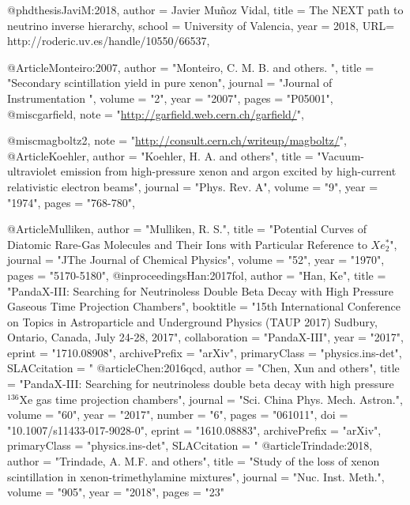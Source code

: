 @phdthesis{JaviM:2018,
  author       = {Javier Muñoz Vidal}, 
  title        = {The NEXT path to neutrino inverse hierarchy},
  school       = {University of Valencia},
  year         = 2018,
  URL= {http://roderic.uv.es/handle/10550/66537},
}

@Article{Monteiro:2007,
     author    = "Monteiro, C. M. B. and others. ",
     title     = "{Secondary scintillation yield in pure xenon}",
     journal   = "Journal of Instrumentation ",
     volume    = "2",
     year      = "2007",
     pages     = "P05001",
}
@misc{garfield,
	note			= "\url{http://garfield.web.cern.ch/garfield/}",
}

@misc{magboltz2,
	note			= "\url{http://consult.cern.ch/writeup/magboltz/}",
}
@Article{Koehler,
     author    = "Koehler, H. A.  and others",
     title     = "{Vacuum-ultraviolet emission from high-pressure xenon and argon excited by high-current relativistic electron beams}",
     journal   = "Phys. Rev. A",
     volume    = "9",
     year      = "1974",
     pages     = "768-780",
}

@Article{Mulliken,
     author    = "Mulliken, R. S.",
     title     = "{Potential Curves of Diatomic Rare-Gas Molecules and Their Ions with Particular Reference to $Xe_2^*$}",
     journal   = "JThe Journal of Chemical Physics",
     volume    = "52",
     year      = "1970",
     pages     = "5170-5180",
}
@inproceedings{Han:2017fol,
      author         = "Han, Ke",
      title          = "{PandaX-III: Searching for Neutrinoless Double Beta Decay
                        with High Pressure Gaseous Time Projection Chambers}",
      booktitle      = "{15th International Conference on Topics in Astroparticle
                        and Underground Physics (TAUP 2017) Sudbury, Ontario,
                        Canada, July 24-28, 2017}",
      collaboration  = "PandaX-III",
      year           = "2017",
      eprint         = "1710.08908",
      archivePrefix  = "arXiv",
      primaryClass   = "physics.ins-det",
      SLACcitation   = "%
}
@article{Chen:2016qcd,
      author         = "Chen, Xun and others",
      title          = "{PandaX-III: Searching for neutrinoless double beta decay
                        with high pressure$^{136}$Xe gas time projection
                        chambers}",
      journal        = "Sci. China Phys. Mech. Astron.",
      volume         = "60",
      year           = "2017",
      number         = "6",
      pages          = "061011",
      doi            = "10.1007/s11433-017-9028-0",
      eprint         = "1610.08883",
      archivePrefix  = "arXiv",
      primaryClass   = "physics.ins-det",
      SLACcitation   = "%
}
@article{Trindade:2018,
     author	= "Trindade, A. M.F. and others",
     title	= "{Study of the loss of xenon scintillation in xenon-trimethylamine mixtures}",
     journal	= "Nuc. Inst. Meth.",
     volume	= "905",
     year	= "2018",
     pages	= "23"	
}


